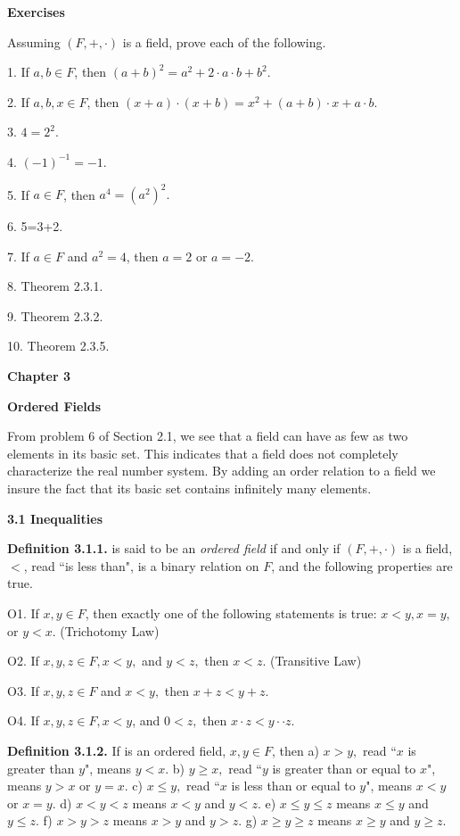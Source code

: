 \begin{large}
\textbf{Exercises}\nl

 Assuming $(F,+,\cdot )$ is a field, prove each of the following.

1. If $a,b \in F$, then $(a+b)^{2} = a^{2} + 2\cdot a\cdot b + b^{2}.$ \nl

2. If $a,b,x \in F$, then $(x+a)\cdot (x+b) = x^{2} + (a+b)\cdot x + a\cdot b.$\nl

3. $4=2^{2}.$\nl

4. $(-1)^{-1} = -1. $\nl

5. If $a\in F$, then $a^{4}=(a^{2})^{2}.$\nl

6. 5=3+2.\nl

7. If $a\in F$ and $a^{2} = 4$, then $a = 2$ or $a = -2.$\nl

8. Theorem 2.3.1.\nl

9. Theorem 2.3.2.\nl

10. Theorem 2.3.5.\nl
\newpage

\textbf{Chapter 3}\nl

\textbf{Ordered Fields}\nl

From problem 6 of Section 2.1, we see that a field can have as few as two elements in its basic set. This indicates that a field does not completely characterize the real number system. By adding an order relation to a field we insure the fact that its basic set contains infinitely many elements.\nl

\textbf{3.1 Inequalities} \nl

\textbf{Definition 3.1.1.} \of  is said to be an \textit{ordered field} if and only if $(F,+, \cdot)$ is a field, $<$, read ``is less than", is a binary relation on $F$, and the following properties are true. \nl

O1. 	If $x,y \in F$, then exactly one of the following statements is true: $x < y, x = y, $ or $y < x.$ (Trichotomy Law) \nl

O2. 	If $x,y,z \in F, x<y,$ and $ y < z,$ then $x < z.$ (Transitive Law) \nl

O3. 	If $x,y,z \in  F$ and $x < y,$ then $x + z < y + z.$ \nl

O4. 	If $x,y,z\in F, x < y$, and $0 < z,$ then $x\cdot z < y\cdot ·z.$\nl

\textbf{Definition 3.1.2.} If \of is an ordered field, $x,y\in F$, then \nl
a) $x > y,$ read ``$x$ is greater than $y$", means $y < x.$ \nl
b) $y \geq x,$ read ``$y$ is greater than or equal to $x$", means $y > x$ or $y = x.$ \nl
c) $x \leq y,$ read ``$x$ is less than or equal to $y$", means $x < y$ or $x = y$. \nl
d) $x < y <z$ means $x < y$ and $y < z.$ \nl
e) $x \leq y \leq z$ means $x\leq y$ and $y\leq z.$ \nl
f) $x > y > z$ means $x > y$ and $y > z.$ \nl
g) $x\geq y \geq z$ means $x \geq y$ and $y \geq z.$ \nl


\end{large}
